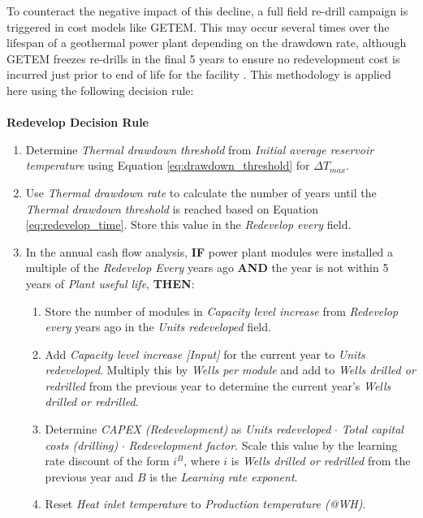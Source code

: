 To counteract the negative impact of this decline, a full field re-drill campaign is triggered in cost models like GETEM. This may occur several times over the lifespan of a geothermal power plant depending on the drawdown rate, although GETEM freezes re-drills in the final 5 years to ensure no redevelopment cost is incurred just prior to end of life for the facility \citep{entingh_volume_2006}. This methodology is applied here using the following decision rule:
\\
\\
\textbf{Redevelop Decision Rule}
\label{ch4:dr_redevelop}
\begin{enumerate}
	\item Determine \textit{Thermal drawdown threshold} from \textit{Initial average reservoir temperature} using Equation \ref{eq:drawdown_threshold} for $\Delta T_{max}$.
	\item Use \textit{Thermal drawdown rate} to calculate the number of years until the \textit{Thermal drawdown threshold} is reached based on Equation \ref{eq:redevelop_time}. Store this value in the \textit{Redevelop every} field.
	\item In the annual cash flow analysis, \textbf{IF} power plant modules were installed a multiple of the \textit{Redevelop Every} years ago \textbf{AND} the year is not within 5 years of \textit{Plant useful life}, \textbf{THEN}:
	\begin{enumerate}
	    \item Store the number of modules in \textit{Capacity level increase} from \textit{Redevelop every} years ago in the \textit{Units redeveloped} field.
	    \item Add \textit{Capacity level increase [Input]} for the current year to \textit{Units redeveloped}. Multiply this by \textit{Wells per module} and add to \textit{Wells drilled or redrilled} from the previous year to determine the current year’s \textit{Wells drilled or redrilled}.
	    \item Determine \textit{CAPEX (Redevelopment)} as \textit{Units redeveloped} $\cdot$ \textit{Total capital costs (drilling)} $\cdot$ \textit{Redevelopment factor}. Scale this value by the learning rate discount of the form $i^B$, where $i$ is \textit{Wells drilled or redrilled} from the previous year and $B$ is the \textit{Learning rate exponent}.
	    \item Reset \textit{Heat inlet temperature} to \textit{Production temperature (@WH)}.
	\end{enumerate}
\end{enumerate}

